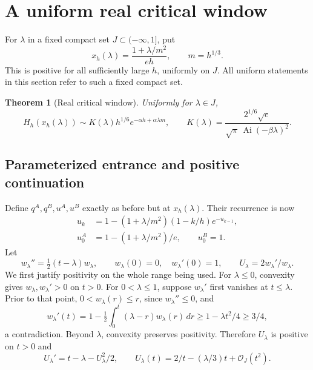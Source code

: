 \documentclass[11pt]{article}
\newtheorem{theorem}{Theorem}[section]
\theoremstyle{remark}\newtheorem{remark}[theorem]{Remark}
\newcommand{\OO}{\mathcal O}
\newcommand{\Ai}{\operatorname{Ai}}
\begin{document}
\section{A uniform real critical window}\label{xtw:airy:sec:window}
For $\lambda$ in a fixed compact set $J\subset(-\infty,1]$, put
\begin{equation}\label{xtw:airy:eq:windowx}
 x_h(\lambda)=\frac{1+\lambda/m^2}{eh},\qquad m=h^{1/3}.
\end{equation}
This is positive for all sufficiently large $h$, uniformly on $J$.
All uniform statements in this section refer to such a fixed compact set.

\begin{theorem}[Real critical window]\label{xtw:airy:thm:window}
Uniformly for $\lambda\in J$,
\begin{equation}\label{xtw:airy:eq:window}
 H_h(x_h(\lambda))\sim K(\lambda)h^{1/6}
             e^{-\alpha h+\alpha\lambda m},\qquad
 K(\lambda)=\frac{2^{1/6}\sqrt e}{\sqrt\pi\,\Ai(-\beta\lambda)^2}.
\end{equation}
\end{theorem}

\subsection{Parameterized entrance and positive continuation}
Define $q^A,q^B,u^A,u^B$ exactly as before but at $x_h(\lambda)$. Their
recurrence is now
\begin{equation}\label{xtw:airy:eq:urectilt}
 \begin{split}
 u_k&=1-(1+\lambda/m^2)(1-k/h)e^{-u_{k-1}},\\
 u_0^A&=1-(1+\lambda/m^2)/e,\qquad u_0^B=1.
 \end{split}
\end{equation}
Let
\begin{equation}\label{xtw:airy:eq:wlambda}
 w_\lambda''=\tfrac12(t-\lambda)w_\lambda,\qquad
 w_\lambda(0)=0,\quad w_\lambda'(0)=1,
 \qquad U_\lambda=2w_\lambda'/w_\lambda.
\end{equation}
We first justify positivity on the whole range being used. For $\lambda\le0$,
convexity gives $w_\lambda,w_\lambda'>0$ on $t>0$. For $0<\lambda\le1$,
suppose $w_\lambda'$ first vanishes at $t\le\lambda$. Prior to that point,
$0<w_\lambda(r)\le r$, since $w_\lambda''\le0$, and
\[
 w_\lambda'(t)
 =1-\tfrac12\int_0^t(\lambda-r)w_\lambda(r)\,dr
 \ge1-\lambda t^2/4\ge3/4,
\]
a contradiction. Beyond $\lambda$, convexity preserves positivity. Therefore
$U_\lambda$ is positive on $t>0$ and
\begin{equation}\label{xtw:airy:eq:Ulambdasmall}
 U_\lambda'=t-\lambda-U_\lambda^2/2,\qquad
 U_\lambda(t)=2/t-(\lambda/3)t+\OO_J(t^2).
\end{equation}
\end{document}
